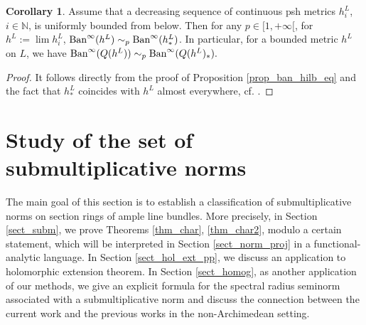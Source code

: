 \documentclass[12pt]{article}
\numberwithin{equation}{section}
\theoremstyle{theorem}
\theoremstyle{definition}
\newtheorem{cor}[thm]{Corollary}
\theoremstyle{remark}
\newcommand{\nat}{\mathbb{N}}
\begin{document}
	\begin{cor}\label{cor_psh_appr_below}
		Assume that a decreasing sequence of continuous psh metrics $h^L_i$, $i \in \nat$, is uniformly bounded from below.
		Then for any $p \in [1, +\infty[$, for $h^L := \lim h^L_i$,
		$
			{\rm{Ban}}^{\infty}(h^L) \sim_p {\rm{Ban}}^{\infty}(h^L_*)
		$.
		In particular, for a bounded metric $h^L$ on $L$, we have ${\rm{Ban}}^{\infty}(Q(h^L)) \sim_p {\rm{Ban}}^{\infty}(Q(h^L)_*).$
	\end{cor}
	\begin{proof}
		It follows directly from the proof of Proposition \ref{prop_ban_hilb_eq} and the fact that $h^L_*$ coincides with $h^L$ almost everywhere, cf. \cite[Proposition I.4.24]{DemCompl}.
	\end{proof}


	
	\section{Study of the set of submultiplicative norms}\label{sect_class_sn}
	The main goal of this section is to establish a classification of submultiplicative norms on section rings of ample line bundles.
	More precisely, in Section \ref{sect_subm}, we prove Theorems \ref{thm_char},  \ref{thm_char2}, modulo a certain statement, which will be interpreted in Section \ref{sect_norm_proj} in a functional-analytic language.
	In Section \ref{sect_hol_ext_pp}, we discuss an application to holomorphic extension theorem.
	In Section \ref{sect_homog}, as another application of our methods, we give an explicit formula for the spectral radius seminorm associated with a submultiplicative norm and discuss the connection between the current work and the previous works in the non-Archimedean setting.
	
\end{document}
